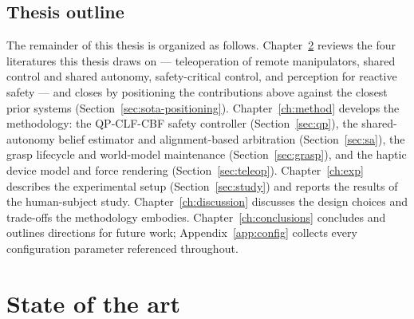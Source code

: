 \documentclass[12pt,a4paper,twoside,openright]{report}
\begin{document}
\section{Thesis outline}
\label{sec:outline}

The remainder of this thesis is organized as follows. Chapter~\ref{ch:sota} reviews the four literatures this thesis draws on --- teleoperation of remote manipulators, shared control and shared autonomy, safety-critical control, and perception for reactive safety --- and closes by positioning the contributions above against the closest prior systems (Section~\ref{sec:sota-positioning}). Chapter~\ref{ch:method} develops the methodology: the QP-CLF-CBF safety controller (Section~\ref{sec:qp}), the shared-autonomy belief estimator and alignment-based arbitration (Section~\ref{sec:sa}), the grasp lifecycle and world-model maintenance (Section~\ref{sec:grasp}), and the haptic device model and force rendering (Section~\ref{sec:teleop}). Chapter~\ref{ch:exp} describes the experimental setup (Section~\ref{sec:study}) and reports the results of the human-subject study. Chapter~\ref{ch:discussion} discusses the design choices and trade-offs the methodology embodies. Chapter~\ref{ch:conclusions} concludes and outlines directions for future work; Appendix~\ref{app:config} collects every configuration parameter referenced throughout.


\chapter{State of the art}
\label{ch:sota}
\end{document}

